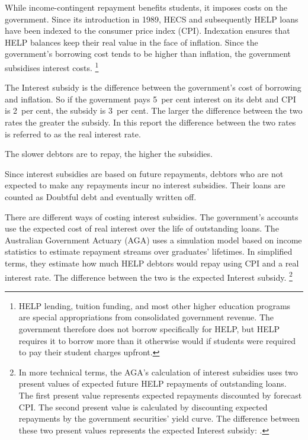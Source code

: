 \documentclass[embargoed]{grattan}
\begin{document}
While income-contingent repayment benefits students, it imposes costs on the government. 
Since its introduction in 1989, \gls{HECS} and subsequently \gls{HELP} loans have been indexed to the consumer price index (\gls{CPI}\@).
Indexation ensures that \gls{HELP} balances keep their real value in the face of inflation.
Since the government’s borrowing cost tends to be higher than inflation, the government subsidises  interest costs.%
\footnote{\gls{HELP} lending, tuition funding, and most other higher education programs are special appropriations from consolidated government revenue.
The government therefore does not borrow specifically for \gls{HELP}, but \gls{HELP} requires it to borrow more than it otherwise would if students were required to pay their student charges upfront.}

The \gls{Interest subsidy} is the difference between the government's cost of borrowing and inflation.
So if the government pays 5~per cent interest on its debt and \gls{CPI} is 2~per cent, the subsidy is 3~per cent.
The larger the difference between the two rates the greater the subsidy.
In this report the difference between the two rates is referred to as the real interest rate.

The slower debtors are to repay, the higher the subsidies. 

Since interest subsidies are based on future repayments, debtors who are not expected to make any repayments incur no interest subsidies.
Their loans are counted as \gls{Doubtful debt} and eventually written off.

There are different ways of costing interest subsidies.
The government's accounts use the expected cost of real interest over the life of outstanding loans.
The Australian Government Actuary (\gls{AGA}) uses a simulation model based on income statistics to estimate repayment streams over graduates' lifetimes.
In simplified terms, they estimate how much \gls{HELP} debtors would repay using \gls{CPI} and a real interest rate.
The difference between the two is the expected \gls{Interest subsidy}.%
\footnote{In more technical terms, the \gls{AGA}'s calculation of interest subsidies uses two present values of expected future \gls{HELP} repayments of outstanding loans.
The first present value represents expected repayments discounted by forecast \gls{CPI}\@.
The second present value is calculated by discounting expected repayments by the government securities' yield curve.
The difference between these two present values represents the expected \gls{Interest subsidy}: \textcite[][Appendix~A]{Consulting2013PrivatisationHECSdebt}.}
\end{document}

